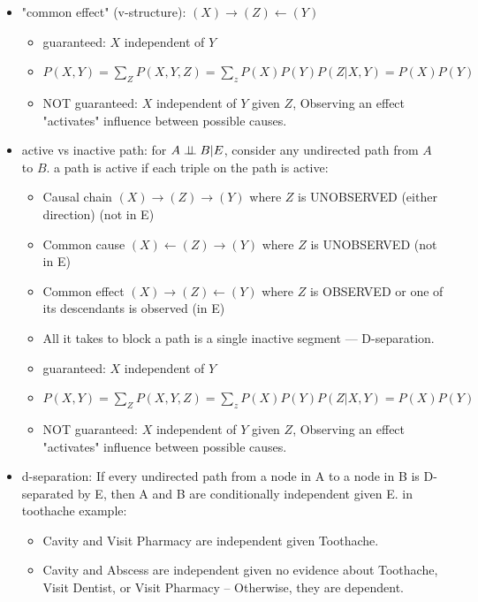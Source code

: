 \documentclass[10pt]{article}
\begin{document}
\begin{itemize}[label=\(\star\), leftmargin=1em, itemsep=-0.3em]
\begin{itemize}[label=\(\star\), leftmargin=1em, itemsep=-0.2em]
          \end{itemize}
    \item "common effect" (v-structure): $(X) \rightarrow (Z) \leftarrow (Y)$
          \begin{itemize}[label=\(\star\), leftmargin=1em, itemsep=-0.2em]
              \item guaranteed: $X$ independent of $Y$
              \item[] $P(X,Y) = \sum_Z P(X,Y,Z) = \sum_z P(X)P(Y)P(Z|X,Y) = P(X)P(Y)$
              \item NOT guaranteed: $X$ independent of $Y$ given $Z$, Observing an effect "activates" influence between possible causes.
          \end{itemize}
    \item active vs inactive path: for $A \perp \!\!\! \perp B | E$, consider any undirected path from $A$ to $B$. a path is active if each triple on the path is active:
          \begin{itemize}[label=\(\star\), leftmargin=1em, itemsep=-0.2em]
              \item Causal chain $(X) \rightarrow (Z) \rightarrow (Y)$ where $Z$ is UNOBSERVED (either direction) (not in E)
              \item Common cause $(X) \leftarrow (Z)  \rightarrow (Y)$ where  $Z$ is UNOBSERVED  (not in E)
              \item Common effect $(X) \rightarrow (Z) \leftarrow (Y)$ where $Z$ is OBSERVED or one of its
                    descendants is observed (in E)
              \item All it takes to block a path is a single inactive segment — D-separation.

          \end{itemize}
          \begin{itemize}[label=\(\star\), leftmargin=1em, itemsep=-0.2em]
              \item guaranteed: $X$ independent of $Y$
              \item[] $P(X,Y) = \sum_Z P(X,Y,Z) = \sum_z P(X)P(Y)P(Z|X,Y) = P(X)P(Y)$
              \item NOT guaranteed: $X$ independent of $Y$ given $Z$, Observing an effect "activates" influence between possible causes.
          \end{itemize}
    \item d-separation: If every undirected path from a node in A to a node in B is D-separated by E, then A and B
          are conditionally independent given E. in toothache example:
          \begin{itemize}[label=\(\star\), leftmargin=1em, itemsep=-0.2em]
              \item Cavity and Visit Pharmacy are independent given Toothache.
              \item Cavity and Abscess are independent given no evidence about Toothache, Visit Dentist, or Visit Pharmacy -- Otherwise, they are dependent.


\end{itemize}
\end{itemize}
\end{document}
